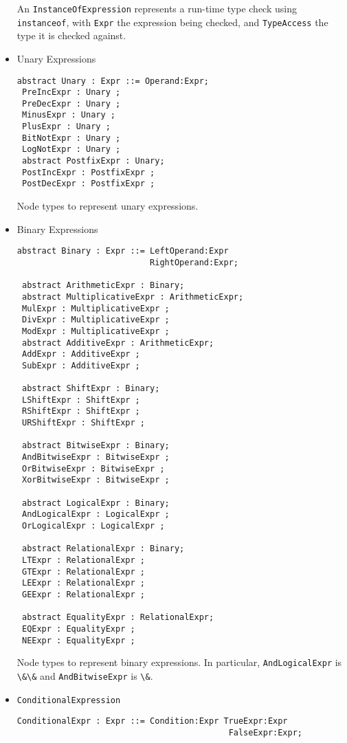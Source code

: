 \documentclass{article}
\newcommand{\nt}[1]{\texttt{#1}}
\newcommand{\child}[1]{\texttt{#1}}
\newcommand{\code}[1]{\lstinline$#1$}
\begin{document}
\begin{itemize}
  An \nt{InstanceOfExpression} represents a run-time type check using\linebreak
  \code{instanceof}, with \child{Expr} the expression being checked,
  and \child{TypeAccess} the type it is checked against.

\item Unary Expressions
  \begin{lstlisting}[frame=single]
 abstract Unary : Expr ::= Operand:Expr;
 PreIncExpr : Unary ;
 PreDecExpr : Unary ;
 MinusExpr : Unary ;
 PlusExpr : Unary ;
 BitNotExpr : Unary ;
 LogNotExpr : Unary ;
 abstract PostfixExpr : Unary;
 PostIncExpr : PostfixExpr ;
 PostDecExpr : PostfixExpr ;
  \end{lstlisting}

  Node types to represent unary expressions.

\item Binary Expressions
  \begin{lstlisting}[frame=single]
 abstract Binary : Expr ::= LeftOperand:Expr 
                           RightOperand:Expr;

 abstract ArithmeticExpr : Binary;
 abstract MultiplicativeExpr : ArithmeticExpr;
 MulExpr : MultiplicativeExpr ;
 DivExpr : MultiplicativeExpr ;
 ModExpr : MultiplicativeExpr ;
 abstract AdditiveExpr : ArithmeticExpr;
 AddExpr : AdditiveExpr ;
 SubExpr : AdditiveExpr ;

 abstract ShiftExpr : Binary;
 LShiftExpr : ShiftExpr ;
 RShiftExpr : ShiftExpr ;
 URShiftExpr : ShiftExpr ;

 abstract BitwiseExpr : Binary;
 AndBitwiseExpr : BitwiseExpr ;
 OrBitwiseExpr : BitwiseExpr ;
 XorBitwiseExpr : BitwiseExpr ;

 abstract LogicalExpr : Binary;
 AndLogicalExpr : LogicalExpr ;
 OrLogicalExpr : LogicalExpr ;

 abstract RelationalExpr : Binary;
 LTExpr : RelationalExpr ;
 GTExpr : RelationalExpr ;
 LEExpr : RelationalExpr ;
 GEExpr : RelationalExpr ;

 abstract EqualityExpr : RelationalExpr;
 EQExpr : EqualityExpr ;
 NEExpr : EqualityExpr ;
  \end{lstlisting}

  Node types to represent binary expressions. In particular,
  \nt{AndLogicalExpr} is \code{\&\&} and \nt{AndBitwiseExpr} is
  \code{\&}.

\item \nt{ConditionalExpression}
  \begin{lstlisting}[frame=single]
 ConditionalExpr : Expr ::= Condition:Expr TrueExpr:Expr 
                                           FalseExpr:Expr;
  \end{lstlisting}


\end{itemize}
\end{document}
